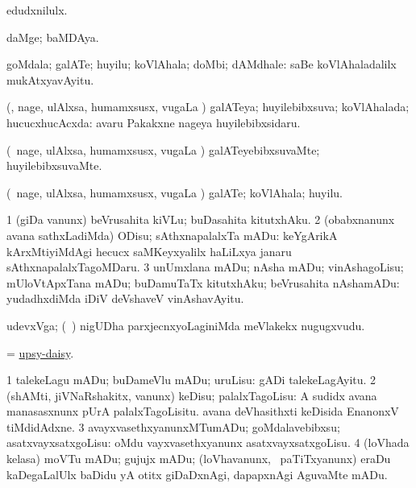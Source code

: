 \bentry
{} 
\gl{\akirx}
\bmng
edudxnilulx. 
\emng
\eentry

\bentry
{} 
\gl{\nA}
\expl{}
\bmng
daMge; baMDAya. 
\emng
\eentry

\bentry
{} 
\gl{\nA}
\expl{}
\bmng
goMdala; galATe; huyilu; koVlAhala; doMbi; dAMdhale:  saBe koVlAhaladalilx mukAtxyavAyitu. 
\emng
\eentry

\bentry
{} 
\gl{\nA}
\expl{}
\bmng
(\kanmu, nage, ulAlxsa, humamxsusx, \mo vugaLa \vi) galATeya; huyilebibxsuva; koVlAhalada; hucucxhucAcxda:  avaru Pakakxne nageya huyilebibxsidaru. 
\emng
\eentry

\bentry
{} 
\gl{\kirxvi}
\expl{}
\bmng
(\kanmu\ nage, ulAlxsa, humamxsusx, \mo vugaLa \vi) galATeyebibxsuvaMte; huyilebibxsuvaMte. 
\emng
\eentry

\bentry
{} 
\gl{\nA}
\expl{}
\bmng
(\kanmu\ nage, ulAlxsa, humamxsusx, \mo vugaLa \vi) galATe; koVlAhala; huyilu. 
\emng
\eentry

\bentry
{} 
\gl{\sakirx}
\expl{}
\bmng
\bnum
\num{1} (giDa \mo vanunx) beVrusahita kiVLu; buDasahita kitutxhAku. 
\num{2} (obabxnanunx avana sathxLadiMda) ODisu; sAthxnapalalxTa mADu:  keYgArikA kArxMtiyiMdAgi hecucx saMKeyxyalilx haLiLxya janaru sAthxnapalalxTagoMDaru. 
\num{3} unUmxlana mADu; nAsha mADu; vinAshagoLisu; mUloVtApxTana mADu; buDamuTaTx kitutxhAku; beVrusahita nAshamADu:  yudadhxdiMda iDiV deVshaveV vinAshavAyitu. 
\enum
\emng
\eentry

\bentry
{} 
\gl{\nA}
\expl{}
\bmng
udevxVga; (\kanmu\ \mavi) nigUDha parxjecnxyoLaginiMda meVlakekx nugugxvudu. 
\emng
\eentry

\bentry
{} 
\gl{\BAavayx}
\expl{}
\bmng
= \hyperlink{upsy-daisy}{upsy-daisy}. 
\emng
\eentry

\bentry
{} 
\gl{\kirx}


\noindent
\gl{\sakirx}
\bmng
\bnum
\num{1} talekeLagu mADu; buDameVlu mADu; uruLisu:  gADi talekeLagAyitu. 
\num{2} (shAMti, jiVNaRshakitx, \mo vanunx) keDisu; palalxTagoLisu:  A sudidx avana manasasxnunx pUrA palalxTagoLisitu.  avana deVhasithxti keDisida EnanonxV tiMdidAdxne. 
\num{3} avayxvasethxyanunxMTumADu; goMdalavebibxsu; asatxvayxsatxgoLisu:  oMdu vayxvasethxyanunx asatxvayxsatxgoLisu. 
\num{4} (loVhada kelasa) moVTu mADu; gujujx mADu; (loVhavanunx, \kanmu\ paTiTxyanunx) eraDu kaDegaLalUlx baDidu yA otitx giDaDxnAgi, dapapxnAgi AguvaMte mADu. 
\enum
\emng

